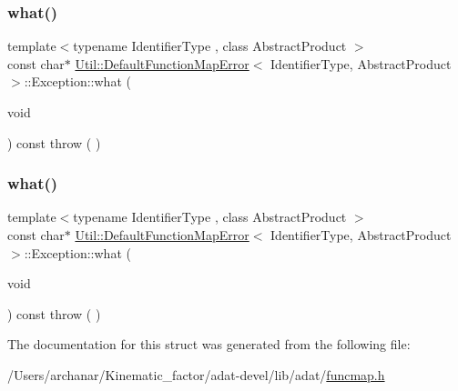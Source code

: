 \subsubsection{\texorpdfstring{what()}{what()}\hspace{0.1cm}{\footnotesize\ttfamily [2/3]}}
{\footnotesize\ttfamily template$<$typename Identifier\+Type , class Abstract\+Product $>$ \\
const char$\ast$ \mbox{\hyperlink{structUtil_1_1DefaultFunctionMapError}{Util\+::\+Default\+Function\+Map\+Error}}$<$ Identifier\+Type, Abstract\+Product $>$\+::Exception\+::what (\begin{DoxyParamCaption}\item[{void}]{ }\end{DoxyParamCaption}) const throw ( ) \hspace{0.3cm}{\ttfamily [inline]}}

\mbox{\label{structUtil_1_1DefaultFunctionMapError_1_1Exception_aa9ee469b7675d8834d6c7ee08378cfbb}} 
\subsubsection{\texorpdfstring{what()}{what()}\hspace{0.1cm}{\footnotesize\ttfamily [3/3]}}
{\footnotesize\ttfamily template$<$typename Identifier\+Type , class Abstract\+Product $>$ \\
const char$\ast$ \mbox{\hyperlink{structUtil_1_1DefaultFunctionMapError}{Util\+::\+Default\+Function\+Map\+Error}}$<$ Identifier\+Type, Abstract\+Product $>$\+::Exception\+::what (\begin{DoxyParamCaption}\item[{void}]{ }\end{DoxyParamCaption}) const throw ( ) \hspace{0.3cm}{\ttfamily [inline]}}



The documentation for this struct was generated from the following file\+:\begin{DoxyCompactItemize}
\item 
/\+Users/archanar/\+Kinematic\+\_\+factor/adat-\/devel/lib/adat/\mbox{\hyperlink{adat-devel_2lib_2adat_2funcmap_8h}{funcmap.\+h}}\end{DoxyCompactItemize}
